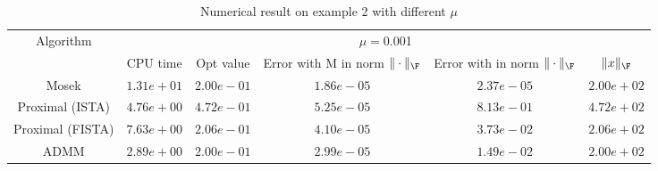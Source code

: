 \begin{table}
\centering
\begin{tabular}{|c|c|c|c|c|c|}

\hline
\multirow{2}{*}{ Algorithm} &\multicolumn{5}{c|}{$\mu=$0.001}\\\cline{2-6}
 &CPU time &Opt value &Error with M in norm $\|\cdot\|_\F$ &Error with in norm $\|\cdot\|_\F$ &$\|x\|_\F$\\\hline
Mosek & $1.31e+01$ & $2.00e-01$ & $1.86e-05$ & $2.37e-05$ & $2.00e+02$\\\hline
Proximal (ISTA) & $4.76e+00$ & $4.72e-01$ & $5.25e-05$ & $8.13e-01$ & $4.72e+02$\\\hline
Proximal (FISTA) & $7.63e+00$ & $2.06e-01$ & $4.10e-05$ & $3.73e-02$ & $2.06e+02$\\\hline
ADMM & $2.89e+00$ & $2.00e-01$ & $2.99e-05$ & $1.49e-02$ & $2.00e+02$\\\hline
\end{tabular}
\caption{Numerical result on example 2 with different $\mu$\label{example2}}
\end{table}
